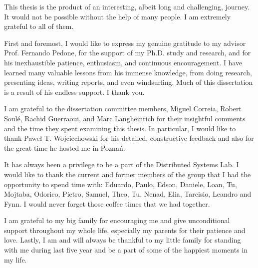 \begin{acknowledgements}

This thesis is the product of an interesting, albeit long and challenging,
journey. It would not be possible without the help of many people. I am
extremely grateful to all of them.

First and foremost, I would like to express my genuine gratitude to my advisor
Prof. Fernando Pedone, for the support of my Ph.D. study and research, and for
his inexhaustible patience, enthusiasm, and continuous encouragement. I have
learned many valuable lessons from his immense knowledge, from doing research,
presenting ideas, writing reports, and even windsurfing. Much of this
dissertation is a result of his endless support. I thank you.
  
I am grateful to the dissertation committee members, Miguel Correia, Robert
Soul\'e, Rachid Guerraoui, and Marc Langheinrich for their insightful comments
and the time they spent examining this thesis. In particular, I would like to
thank Paweł T. Wojciechowski for his detailed, constructive feedback and also
for the great time he hosted me in Poznań.
  
It has always been a privilege to be a part of the Distributed Systems Lab. I
would like to thank the current and former members of the group that I had the
opportunity to spend time with: Eduardo, Paulo, Edson, Daniele, Loan, Tu,
Mojtaba, Odorico, Pietro, Samuel, Theo, Tu, Nenad, Elia, Tarcisio, Leandro and
Fynn. I would never forget those coffee times that we had together.
  
I am grateful to my big family for encouraging me and give unconditional support
throughout my whole life, especially my parents for their patience and love.
Lastly, I am and will always be thankful to my little family for standing with
me during last five year and be a part of some of the happiest moments in my
life.

\end{acknowledgements}
